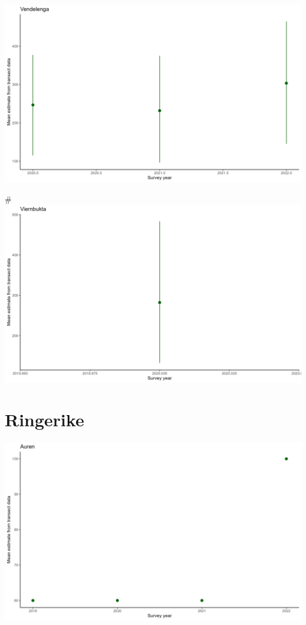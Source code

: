 \documentclass[
  letterpaper,
  DIV=11,
  numbers=noendperiod]{scrreport}
\begin{document}
\includegraphics{Figurer/trans_Est/Vendelenga_plot.png}

\#\includegraphics{Figurer/trans_Est/Viernbukta_plot.png}

\hypertarget{ringerike-3}{%
\section{Ringerike}\label{ringerike-3}}

\includegraphics{Figurer/trans_Est/Auren_plot.png}
\end{document}
